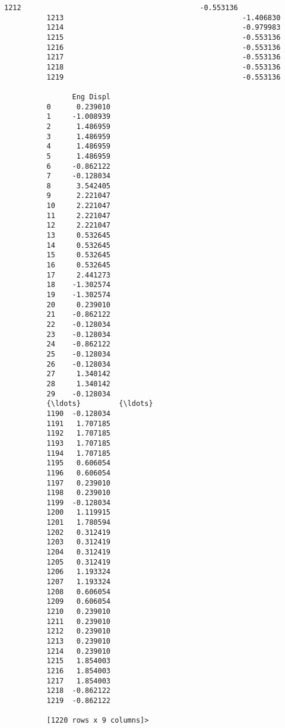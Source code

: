 \documentclass[11pt]{article}
\begin{document}
\begin{Verbatim}[commandchars=\\\{\}]
          1212                                          -0.553136                               
          1213                                          -1.406830                               
          1214                                          -0.979983                               
          1215                                          -0.553136                               
          1216                                          -0.553136                               
          1217                                          -0.553136                               
          1218                                          -0.553136                               
          1219                                          -0.553136                               
          
                Eng Displ  
          0      0.239010  
          1     -1.008939  
          2      1.486959  
          3      1.486959  
          4      1.486959  
          5      1.486959  
          6     -0.862122  
          7     -0.128034  
          8      3.542405  
          9      2.221047  
          10     2.221047  
          11     2.221047  
          12     2.221047  
          13     0.532645  
          14     0.532645  
          15     0.532645  
          16     0.532645  
          17     2.441273  
          18    -1.302574  
          19    -1.302574  
          20     0.239010  
          21    -0.862122  
          22    -0.128034  
          23    -0.128034  
          24    -0.862122  
          25    -0.128034  
          26    -0.128034  
          27     1.340142  
          28     1.340142  
          29    -0.128034  
          {\ldots}         {\ldots}  
          1190  -0.128034  
          1191   1.707185  
          1192   1.707185  
          1193   1.707185  
          1194   1.707185  
          1195   0.606054  
          1196   0.606054  
          1197   0.239010  
          1198   0.239010  
          1199  -0.128034  
          1200   1.119915  
          1201   1.780594  
          1202   0.312419  
          1203   0.312419  
          1204   0.312419  
          1205   0.312419  
          1206   1.193324  
          1207   1.193324  
          1208   0.606054  
          1209   0.606054  
          1210   0.239010  
          1211   0.239010  
          1212   0.239010  
          1213   0.239010  
          1214   0.239010  
          1215   1.854003  
          1216   1.854003  
          1217   1.854003  
          1218  -0.862122  
          1219  -0.862122  
          
          [1220 rows x 9 columns]>
\end{Verbatim}
        
\end{document}
